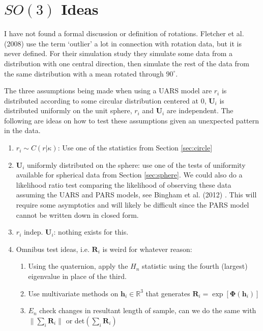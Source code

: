 \documentclass{article}\usepackage[]{graphicx}\usepackage[]{color}
\newcommand{\R}{{\mathbb{R}}}
\begin{document}
\section{$SO(3)$ Ideas}

I have not found a formal discussion or definition of rotations. Fletcher et al. (2008) \cite{fletcher2008} use the term `outlier' a lot in connection with rotation data, but it is never defined.  For their simulation study they simulate some data from a distribution with one central direction, then simulate the rest of the data from the same distribution with a mean rotated through $90^\circ$.

The three assumptions being made when using a UARS model are $r_i$ is distributed according to some circular distribution centered at $0$, $\bm U_i$ is distributed uniformly on the unit sphere, $r_i$ and $\bm U_i$ are independent.  The following are ideas on how to test these assumptions given an unexpected pattern in the data.
\begin{enumerate}
\item $r_i\sim C(r|\kappa)$: Use one of the statistics from Section \ref{sec:circle}
\item $\bm U_i$ uniformly distributed on the sphere:  use one of the tests of uniformity available for spherical data from Section \ref{sec:sphere}.  We could also do a likelihood ratio test comparing the likelihood of observing these data assuming the UARS and PARS models, see Bingham et al. (2012) \cite{bingham2012}.  This will require some asymptotics and will likely be difficult since the PARS model cannot be written down in closed form.
\item $r_i$ indep. $\bm U_i$: nothing exists for this.  
\item Omnibus test ideas, i.e. $\bm R_i$ is weird for whatever reason:
\begin{enumerate}
\item Using the quaternion, apply the $H_n$ statistic using the fourth (largest) eigenvalue in place of the third.
\item Use multivariate methods on $\bm h_i\in\R^3$ that generates $\bm R_i=\exp[\bm{\Phi}(\bm h_i)]$
\item $E_n$ check changes in resultant length of sample, can we do the same with $\|\sum_i\bm R_i\|$ or det$(\sum_i \bm R_i)$
\end{enumerate}
\end{enumerate}



\end{document}
